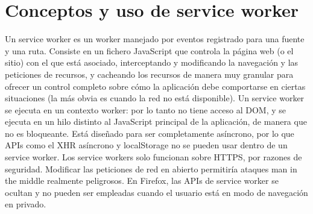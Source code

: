 \documentclass{article}
\begin{document}
\section{Conceptos y uso de service worker}
Un service worker es un worker manejado por eventos registrado para una fuente y una ruta. Consiste en un fichero JavaScript que controla la página web (o el sitio) con el que está asociado, interceptando y modificando la navegación y las peticiones de recursos, y cacheando los recursos de manera muy granular para ofrecer un control completo sobre cómo la aplicación debe comportarse en ciertas situaciones (la más obvia es cuando la red no está disponible). Un service worker se ejecuta en un contexto worker: por lo tanto no tiene acceso al DOM, y se ejecuta en un hilo distinto al JavaScript principal de la aplicación, de manera que no es bloqueante. Está diseñado para ser completamente asíncrono, por lo que APIs como el XHR asíncrono y localStorage no se pueden usar dentro de un service worker. Los service workers solo funcionan sobre HTTPS, por razones de seguridad. Modificar las peticiones de red en abierto permitiría ataques man in the middle realmente peligrosos. En Firefox, las APIs de service worker se ocultan y no pueden ser empleadas cuando el usuario está en modo de navegación en privado.
\end{document}
